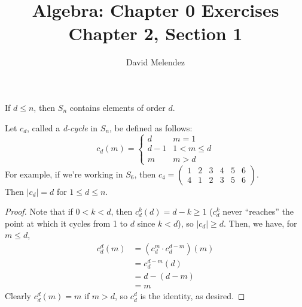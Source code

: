 \documentclass[12pt]{article}
\newenvironment{problem}[2][Problem]{\begin{trivlist}
\item[\hskip \labelsep {\bfseries #1}\hskip \labelsep {\bfseries #2.}]}{\end{trivlist}}
\newenvironment{proposition}[1][Proposition]{\begin{trivlist}
\item[\hskip \labelsep {\bfseries #1.}]}{\end{trivlist}}
\begin{document}
\title{Algebra: Chapter 0 Exercises\\ \large Chapter 2, Section 1}
\author{David Melendez}
\maketitle

\begin{problem}{2.2}
  If $d\leq n$, then $S_n$ contains elements of order $d$.
\end{problem}
\begin{proposition}
  Let $c_d$, called a \textit{d-cycle} in $S_n$, be defined as follows:
  \begin{equation*}
    c_d(m) = 
    \begin{cases}
      d   & m = 1 \\
      d-1 & 1 < m \leq d \\
      m   & m > d
    \end{cases}
  \end{equation*}
  For example, if we're working in $S_6$, then 
  $c_4 = \begin{pmatrix} 1&2&3&4&5&6 \\ 4&1&2&3&5&6 \end{pmatrix}$. \\
  Then $|c_d| = d$ for $1 \leq d \leq n$.
\end{proposition}
\begin{proof}
  Note that if $0 < k < d$, then 
  $c_d^k(d) = d-k \geq 1$ 
  ($c_d^k$ never ``reaches'' the point at which it cycles from 1 to $d$ since $k<d$), 
  so $|c_d| \geq d$. Then, we have, for $m\leq d$,
  \begin{align*}
    c_d^d(m) &= (c_d^m \cdot c_d^{d-m})(m)\\
    &= c_d^{d-m}(d) \\
    &= d - (d - m) \\
    &= m
  \end{align*}
  Clearly $c_d^d(m) = m$ if $m>d$, so $c_d^d$ is the identity, as desired.
\end{proof}
\end{document}
